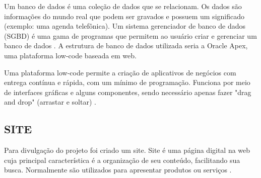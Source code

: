 Um banco de dados é uma coleção de dados que se relacionam. Os dados são informações do mundo real que podem ser gravados e possuem um significado (exemplo: uma agenda telefônica). Um sistema gerenciador de banco de dados (SGBD) é uma gama de programas que permitem ao usuário criar e gerenciar um banco de dados \cite{elmasri2005}. A estrutura de banco de dados utilizada seria a Oracle Apex, uma plataforma low-code baseada em web.

Uma plataforma low-code permite a criação de aplicativos de negócios com entrega contínua e rápida, com um mínimo de programação. Funciona por meio de interfaces gráficas e alguns componentes, sendo necessário apenas fazer "drag and drop" (arrastar e soltar) \cite{karmali2019}.

\subsection*{SITE}

Para divulgação do projeto foi criado um site. Site é uma página digital na web cuja principal característica é a organização de seu conteúdo, facilitando sua busca. Normalmente são utilizados para apresentar produtos ou serviços \cite{martha2010}.

